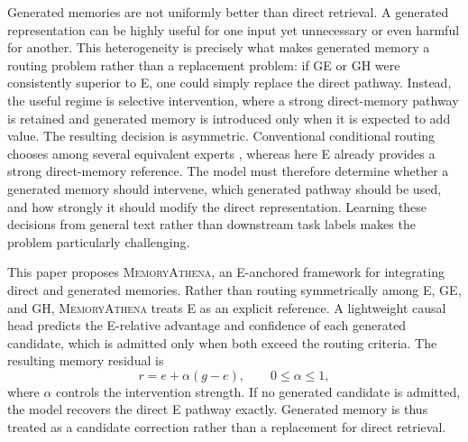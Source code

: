 \documentclass{article}
\begin{document}
Generated memories are not uniformly better than direct retrieval.
A generated representation can be highly useful for one input yet unnecessary
or even harmful for another. This heterogeneity is precisely what makes
generated memory a routing problem rather than a replacement problem: if GE or
GH were consistently superior to E, one could simply replace the direct
pathway. Instead, the useful regime is selective intervention, where a strong
direct-memory pathway is retained and generated memory is introduced only when
it is expected to add value.
%
The resulting decision is asymmetric. Conventional conditional routing chooses
among several equivalent experts \citep{shazeer2017moe}, whereas here E already
provides a strong direct-memory reference. The model must therefore determine
whether a generated memory should intervene, which generated pathway should be
used, and how strongly it should modify the direct representation. Learning
these decisions from general text rather than downstream task labels makes the
problem particularly challenging.

This paper proposes \textsc{MemoryAthena}, an E-anchored framework for
integrating direct and generated memories. Rather than routing symmetrically
among E, GE, and GH, \textsc{MemoryAthena} treats E as an explicit reference.
A lightweight causal head predicts the E-relative advantage and confidence of
each generated candidate, which is admitted only when both exceed the routing
criteria. The resulting memory residual is
\begin{equation}
    r = e + \alpha(g-e),
    \qquad 0 \leq \alpha \leq 1,
\end{equation}
where $\alpha$ controls the intervention strength. If no generated candidate is
admitted, the model recovers the direct E pathway exactly. Generated memory is
thus treated as a candidate correction rather than a replacement for direct
retrieval.
\end{document}
